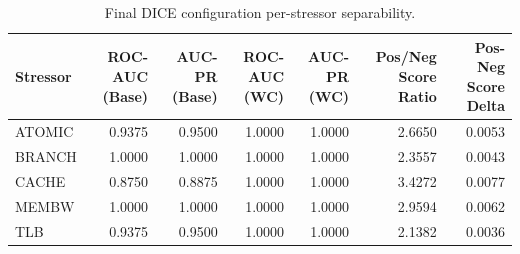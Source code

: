 \begin{table}[t]
\centering
\caption{Final DICE configuration per-stressor separability.}
\label{tab:dice_full_stressor}
\footnotesize
\begin{tabular}{lrrrrrr}
\toprule
Stressor & ROC-AUC (Base) & AUC-PR (Base) & ROC-AUC (WC) & AUC-PR (WC) & Pos/Neg Score Ratio & Pos-Neg Score Delta \\
\midrule
ATOMIC & 0.9375 & 0.9500 & 1.0000 & 1.0000 & 2.6650 & 0.0053 \\
BRANCH & 1.0000 & 1.0000 & 1.0000 & 1.0000 & 2.3557 & 0.0043 \\
CACHE & 0.8750 & 0.8875 & 1.0000 & 1.0000 & 3.4272 & 0.0077 \\
MEMBW & 1.0000 & 1.0000 & 1.0000 & 1.0000 & 2.9594 & 0.0062 \\
TLB & 0.9375 & 0.9500 & 1.0000 & 1.0000 & 2.1382 & 0.0036 \\
\bottomrule
\end{tabular}

\end{table}
